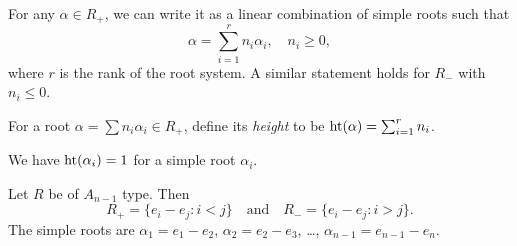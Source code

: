 \begin{corollary}
  For any $\alpha \in R_+$, we can write it
  as a linear combination of
  simple roots such that
  \[
    \alpha = \sum_{i = 1}^r n_i \alpha_i, \quad
    n_i \ge 0,
  \]
  where $r$ is the rank of the root system.
  A similar statement holds for
  $R_-$ with $n_i \le 0$.
\end{corollary}

\begin{definition}
  For a root $\alpha = \sum n_i \alpha_i \in R_+$, define
  its \emph{height} to be
  $\operatorname{ht}(\alpha) = \sum_{i = 1}^r n_i$.
\end{definition}

\begin{remark}
  We have $\operatorname{ht}(\alpha_i) = 1$ for a
  simple root $\alpha_i$.
\end{remark}

\begin{example}
  Let $R$ be of $A_{n - 1}$ type. Then
  \[
    R_+ = \{e_i - e_j : i < j\}
    \quad \text{and} \quad
    R_- = \{e_i - e_j : i > j\}.
  \]
  The simple roots are
  $\alpha_1 = e_1 - e_2$,
  $\alpha_2 = e_2 - e_3$, \dots,
  $\alpha_{n - 1} = e_{n - 1} - e_n$.
\end{example}
